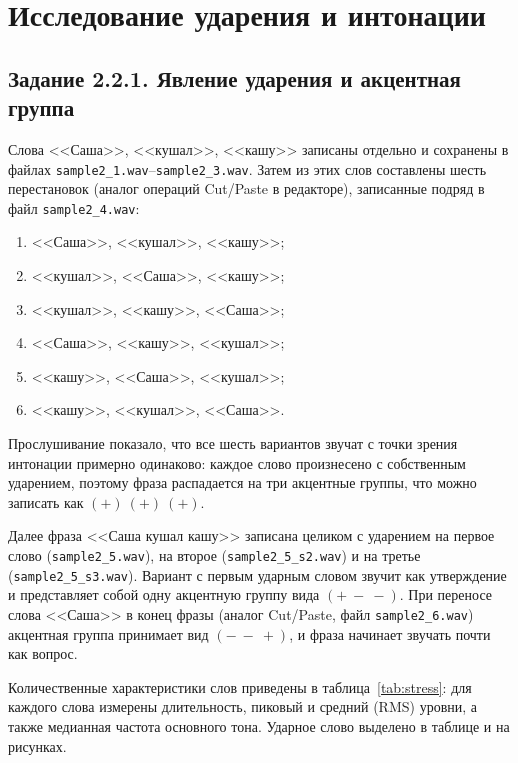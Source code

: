 \section{Исследование ударения и интонации}

\subsection{Задание 2.2.1. Явление ударения и акцентная группа}

Слова <<Саша>>, <<кушал>>, <<кашу>> записаны отдельно и сохранены в
файлах \texttt{sample2\_1.wav}--\texttt{sample2\_3.wav}. Затем из этих
слов составлены шесть перестановок (аналог операций Cut/Paste в
редакторе), записанные подряд в файл \texttt{sample2\_4.wav}:
\begin{enumerate}
	\item <<Саша>>, <<кушал>>, <<кашу>>;
	\item <<кушал>>, <<Саша>>, <<кашу>>;
	\item <<кушал>>, <<кашу>>, <<Саша>>;
	\item <<Саша>>, <<кашу>>, <<кушал>>;
	\item <<кашу>>, <<Саша>>, <<кушал>>;
	\item <<кашу>>, <<кушал>>, <<Саша>>.
\end{enumerate}
Прослушивание показало, что все шесть вариантов звучат с точки зрения
интонации примерно одинаково: каждое слово произнесено с собственным
ударением, поэтому фраза распадается на три акцентные группы, что можно
записать как $(+)\ (+)\ (+)$.

Далее фраза <<Саша кушал кашу>> записана целиком с ударением на первое
слово (\texttt{sample2\_5.wav}), на второе
(\texttt{sample2\_5\_s2.wav}) и на третье
(\texttt{sample2\_5\_s3.wav}). Вариант с первым ударным словом звучит
как утверждение и представляет собой одну акцентную группу вида
$(+\ - \ -)$. При переносе слова <<Саша>> в конец фразы (аналог
Cut/Paste, файл \texttt{sample2\_6.wav}) акцентная группа принимает вид
$(-\ -\ +)$, и фраза начинает звучать почти как вопрос.

Количественные характеристики слов приведены в
таблица~\ref{tab:stress}: для каждого слова измерены длительность,
пиковый и средний (RMS) уровни, а также медианная частота основного
тона. Ударное слово выделено в таблице и на рисунках.

